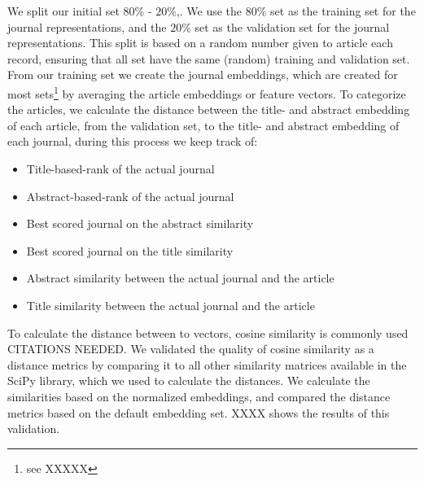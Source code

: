 \documentclass[../../Thesis.tex]{subfiles}
\begin{document}
We split our initial set  $80\%$ - $20\%$,. We use the $80\%$ set as the training set for the journal representations, and the $20\%$ set as the validation set for the journal representations. This split is based on a random number given to article each record, ensuring that all set have the same (random) training and validation set.
From our training set we create the journal embeddings, which are created for most sets\footnote{see XXXXX} by averaging the article embeddings or feature vectors.
To categorize the articles, we calculate the distance between the title- and abstract embedding of each article, from the validation set, to the title- and abstract embedding of each journal, during this process we keep track of:
\begin{itemize}
\item{Title-based-rank of the actual journal}
\item{Abstract-based-rank of the actual journal}
\item{Best scored journal on the abstract similarity}
\item{Best scored journal on the title similarity}
\item{Abstract similarity between the actual journal and the article}
\item{Title similarity between the actual journal and the article}
\end{itemize}
To calculate the distance between to vectors, cosine similarity is commonly used CITATIONS NEEDED. We validated the quality of cosine similarity as a distance metrics by comparing it to all other similarity matrices available in the SciPy library, which we used to calculate the distances. We calculate the similarities based on the normalized embeddings, and compared the distance metrics based on the default embedding set. XXXX shows the results of this validation.\\
\end{document}
